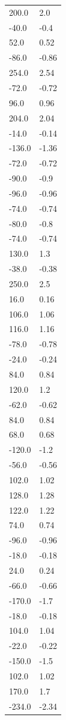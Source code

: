 \begin{longtable}{ll}
200.0 & 2.0 \\
-40.0 & -0.4 \\
52.0 & 0.52 \\
-86.0 & -0.86 \\
254.0 & 2.54 \\
-72.0 & -0.72 \\
96.0 & 0.96 \\
204.0 & 2.04 \\
-14.0 & -0.14 \\
-136.0 & -1.36 \\
-72.0 & -0.72 \\
-90.0 & -0.9 \\
-96.0 & -0.96 \\
-74.0 & -0.74 \\
-80.0 & -0.8 \\
-74.0 & -0.74 \\
130.0 & 1.3 \\
-38.0 & -0.38 \\
250.0 & 2.5 \\
16.0 & 0.16 \\
106.0 & 1.06 \\
116.0 & 1.16 \\
-78.0 & -0.78 \\
-24.0 & -0.24 \\
84.0 & 0.84 \\
120.0 & 1.2 \\
-62.0 & -0.62 \\
84.0 & 0.84 \\
68.0 & 0.68 \\
-120.0 & -1.2 \\
-56.0 & -0.56 \\
102.0 & 1.02 \\
128.0 & 1.28 \\
122.0 & 1.22 \\
74.0 & 0.74 \\
-96.0 & -0.96 \\
-18.0 & -0.18 \\
24.0 & 0.24 \\
-66.0 & -0.66 \\
-170.0 & -1.7 \\
-18.0 & -0.18 \\
104.0 & 1.04 \\
-22.0 & -0.22 \\
-150.0 & -1.5 \\
102.0 & 1.02 \\
170.0 & 1.7 \\
-234.0 & -2.34 \\

\end{longtable}
